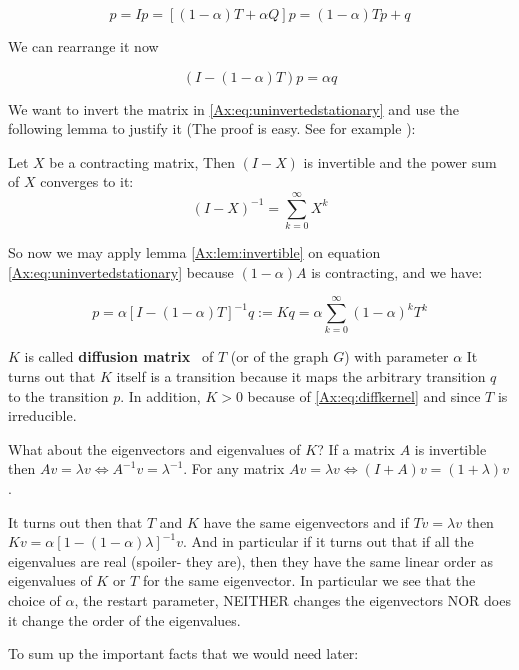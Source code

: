 \[
p = Ip
= [(1 - \alpha)T + \alpha Q]p =  (1 - \alpha)Tp + q 
\]

We can rearrange it now

\begin{equation}
\label{Ax:eq:uninvertedstationary}
(I - (1 - \alpha)T)p = \alpha q
\end{equation}

We want to invert the matrix in \ref{Ax:eq:uninvertedstationary} and use the
following lemma to justify it (The proof is easy. See for example
\textcite{serre2010matrices}):

\begin{lemma}
\label{Ax:lem:invertible}
Let $X$ be a contracting matrix, Then $(I-X)$ is invertible and the power sum of
$X$ converges to it:
\[
(I - X)^{-1} = \sum_{k=0}^{\infty} X^k
\]
\end{lemma}

So now we may apply lemma \ref{Ax:lem:invertible} on equation
\ref{Ax:eq:uninvertedstationary} because $(1-\alpha)A$ is contracting, and we have:

\begin{equation}
\label{Ax:eq:diffkernel}
p = \alpha [I - (1 - \alpha)T]^{-1} q := K q = 
\alpha \sum_{k=0}^{\infty} (1 - \alpha)^k T^k
\end{equation}

$K$ is called \textbf{diffusion matrix}~\cite{leiserson2015pan} of $T$ (or of the graph $G$) with parameter $\alpha$
It turns out that $K$ itself is a transition because it maps the
arbitrary transition $q$ to the transition $p$. In addition, $K \gt 0$ because
of \ref{Ax:eq:diffkernel} and since $T$ is irreducible.

What about the eigenvectors and eigenvalues of $K$?
If a matrix $A$ is invertible then $Av = \lambda v \iff A^{-1}v = \lambda^{-1}$.
For any matrix $Av = \lambda v \iff (I + A)v = (1+\lambda)v$.

It turns out then that $T$ and $K$ have the same eigenvectors and if $Tv=\lambda
v$ then $K v = \alpha [1 - (1 - \alpha) \lambda]^{-1} v$. And in particular if it
turns out that if all the eigenvalues are real (spoiler- they are), then they have
the same linear order as eigenvalues of $K$ or $T$ for the same eigenvector.
In particular we see that the choice of $\alpha$, the restart parameter, NEITHER 
changes the eigenvectors NOR does it change the order of the eigenvalues.

To sum up the important facts that we would need later:

